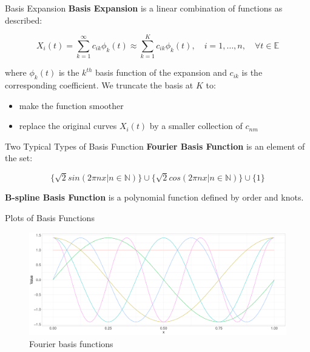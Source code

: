 \documentclass{beamer}
\begin{document}
	\begin{frame}{Basis Expansion}
		\textbf{Basis Expansion} is a linear combination of functions as described:
		
		$$X_{i}(t) = \sum_{k=1}^{\infty} c_{ik}\phi_{k}(t) \approx \sum_{k=1}^{K} c_{ik}\phi_{k}(t), \quad i = 1, \dots, n, \quad \forall t \in \mathbb{E}$$
		
		where $\phi_{k}(t)$ is the $k^{th}$ basis function of the expansion and $c_{ik}$ is the corresponding coefficient. We truncate the basis at $K$ to:
		\vspace{0.2cm}
		
		\begin{itemize}
			\item make the function smoother
			\item replace the original curves $X_{i}(t)$ by a smaller collection of $c_{nm}$
		\end{itemize}		
	\end{frame}
	
	\begin{frame}{Two Typical Types of Basis Function}
		\textbf{Fourier Basis Function} is an element of the set:
		
		$$\{\sqrt{2}sin(2\pi nx | n \in \mathbb{N})\} \cup \{\sqrt{2}cos(2\pi nx | n \in \mathbb{N})\} \cup \{1\}$$
		
		
		\vspace{2\baselineskip}
		\textbf{B-spline Basis Function} is a polynomial function defined by order and knots. \\
		
	\end{frame}
	
	\begin{frame}{Plots of Basis Functions}
		\begin{figure}
			\includegraphics[height = 4.5cm]{../Graphics/Fourier_Basis.pdf}
			\caption {Fourier basis functions}
		\end{figure}
			
	\end{frame}
	
\end{document}
